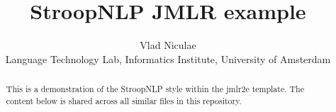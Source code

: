 \documentclass[twoside,11pt,a4paper]{article}
\title{StroopNLP JMLR example}
\author{%
\name Vlad Niculae
\email \eml{v.niculae@uva.nl}\\
\addr Language Technology Lab,
Informatics Institute,
University of Amsterdam
}
\date{}
\begin{document}
\maketitle
\begin{abstract}
This is a demonstration of the StroopNLP style within the jmlr2e template.
The content below is shared across all similar files in this repository.
\end{abstract}





\end{document}
